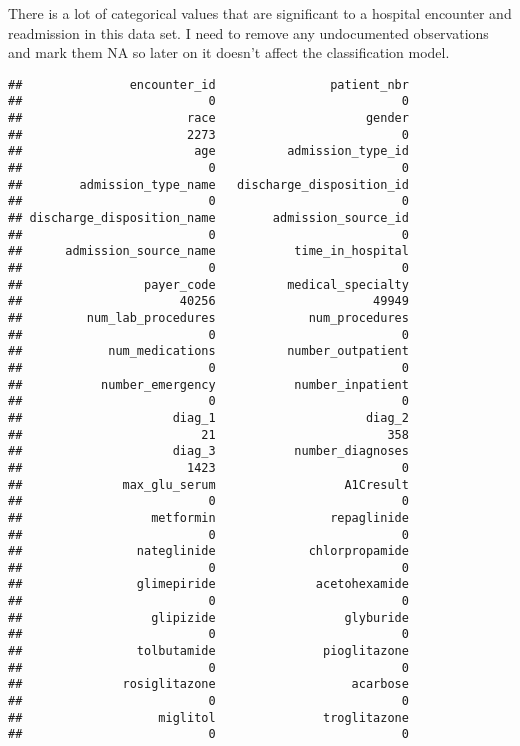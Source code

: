 \documentclass[
]{article}
\begin{document}
There is a lot of categorical values that are significant to a hospital
encounter and readmission in this data set. I need to remove any
undocumented observations and mark them NA so later on it doesn't affect
the classification model.

\begin{verbatim}
##               encounter_id                patient_nbr 
##                          0                          0 
##                       race                     gender 
##                       2273                          0 
##                        age          admission_type_id 
##                          0                          0 
##        admission_type_name   discharge_disposition_id 
##                          0                          0 
## discharge_disposition_name        admission_source_id 
##                          0                          0 
##      admission_source_name           time_in_hospital 
##                          0                          0 
##                 payer_code          medical_specialty 
##                      40256                      49949 
##         num_lab_procedures             num_procedures 
##                          0                          0 
##            num_medications          number_outpatient 
##                          0                          0 
##           number_emergency           number_inpatient 
##                          0                          0 
##                     diag_1                     diag_2 
##                         21                        358 
##                     diag_3           number_diagnoses 
##                       1423                          0 
##              max_glu_serum                  A1Cresult 
##                          0                          0 
##                  metformin                repaglinide 
##                          0                          0 
##                nateglinide             chlorpropamide 
##                          0                          0 
##                glimepiride              acetohexamide 
##                          0                          0 
##                  glipizide                  glyburide 
##                          0                          0 
##                tolbutamide               pioglitazone 
##                          0                          0 
##              rosiglitazone                   acarbose 
##                          0                          0 
##                   miglitol               troglitazone 
##                          0                          0 

\end{verbatim}
\end{document}

